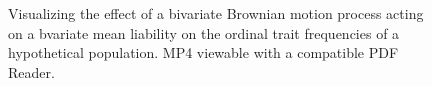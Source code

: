 \documentclass[10pt, twocolumn, twoside]{article}
\begin{document}
\begin{figure}[h]
\centering
{}
\caption[Bivariate Brownian Motion Under the Threshold Model]{Visualizing the effect of a bivariate Brownian motion process acting on a bvariate mean liability on the ordinal trait frequencies of a hypothetical population. MP4 viewable with a compatible PDF Reader.}
\label{fig:bivBM}
\end{figure}







\end{document}
